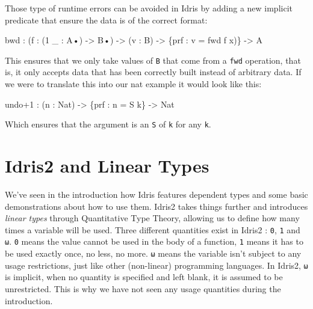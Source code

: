 \documentclass[
]{article}
\newenvironment{Shaded}{}{}
\newcommand{\DataTypeTok}[1]{\textcolor[rgb]{0.56,0.13,0.00}{#1}}
\newcommand{\DecValTok}[1]{\textcolor[rgb]{0.25,0.63,0.44}{#1}}
\newcommand{\NormalTok}[1]{#1}
\newcommand{\OperatorTok}[1]{\textcolor[rgb]{0.40,0.40,0.40}{#1}}
\newcommand{\OtherTok}[1]{\textcolor[rgb]{0.00,0.44,0.13}{#1}}
\begin{document}
Those type of runtime errors can be avoided in Idris by adding a new
implicit predicate that ensure the data is of the correct format:

\begin{Shaded}
\begin{Highlighting}[]
\NormalTok{bwd }\OperatorTok{:}\NormalTok{ (f }\OperatorTok{:}\NormalTok{ (}\DecValTok{1}\NormalTok{ \_ }\OperatorTok{:} \DataTypeTok{A}\NormalTok{•) }\OtherTok{{-}\textgreater{}} \DataTypeTok{B}\NormalTok{•) }\OtherTok{{-}\textgreater{}}\NormalTok{ (v }\OperatorTok{:} \DataTypeTok{B}\NormalTok{) }\OtherTok{{-}\textgreater{}}\NormalTok{ \{prf }\OperatorTok{:}\NormalTok{ v }\OtherTok{=}\NormalTok{ fwd f x)\} }\OtherTok{{-}\textgreater{}} \DataTypeTok{A}
\end{Highlighting}
\end{Shaded}

This ensures that we only take values of \texttt{B} that come from a
\texttt{fwd} operation, that is, it only accepts data that has been
correctly built instead of arbitrary data. If we were to translate this
into our nat example it would look like this:

\begin{Shaded}
\begin{Highlighting}[]
\NormalTok{undo}\OperatorTok{+}\DecValTok{1} \OperatorTok{:}\NormalTok{ (n }\OperatorTok{:} \DataTypeTok{Nat}\NormalTok{) }\OtherTok{{-}\textgreater{}}\NormalTok{ \{prf }\OperatorTok{:}\NormalTok{ n }\OtherTok{=} \DataTypeTok{S}\NormalTok{ k\} }\OtherTok{{-}\textgreater{}} \DataTypeTok{Nat}
\end{Highlighting}
\end{Shaded}

Which ensures that the argument is an \texttt{S} of \texttt{k} for any
\texttt{k}.

\newpage

\hypertarget{idris2-and-linear-types}{%
\section{Idris2 and Linear Types}\label{idris2-and-linear-types}}

We've seen in the introduction how Idris features dependent types and
some basic demonstrations about how to use them. Idris2 takes things
further and introduces \emph{linear types} through Quantitative Type
Theory, allowing us to define how many times a variable will be used.
Three different quantities exist in Idris2 : \texttt{0}, \texttt{1} and
\texttt{ω}. \texttt{0} means the value cannot be used in the body of a
function, \texttt{1} means it has to be used exactly once, no less, no
more. \texttt{ω} means the variable isn't subject to any usage
restrictions, just like other (non-linear) programming languages. In
Idris2, \texttt{ω} is implicit, when no quantity is specified and left
blank, it is assumed to be unrestricted. This is why we have not seen
any usage quantities during the introduction.
\end{document}
